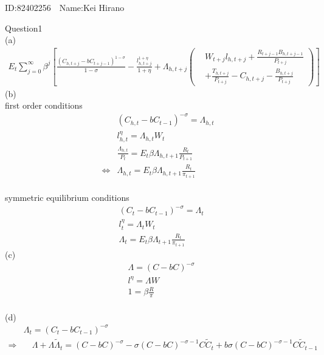\documentclass{article}
\begin{document}
\begin{CJK}{UTF8}{min}
\begin{flushright} %
ID:82402256　Name:Kei Hirano\\
\end{flushright}
Question1\\(a)\\
\begin{align*}
E_t \sum^\infty_{j=0} \beta^j \left[
    \frac{(C_{h,t+j} - b C_{t+j-1})^{1-\sigma}}{1-\sigma} 
    - \frac{l_{h,t+j}^{1+\eta}}{1+\eta} 
    + \Lambda_{h,t+j} \left(
        \begin{aligned}
        & W_{t+j} l_{h,t+j} 
        + \frac{R_{t+j-1} B_{h,t+j-1}}{P_{t+j}} \\
        & + \frac{T_{h,t+j}}{P_{t+j}} 
        - C_{h,t+j} 
        - \frac{B_{h,t+j}}{P_{t+j}} 
        \end{aligned}
    \right)
\right]
\end{align*}
(b)\\
first order conditions\\
\begin{align*}
&(C_{h,t}-bC_{t-1})^{-\sigma}=\Lambda_{h,t}\\
&l^\eta_{h,t}=\Lambda_{h,t}W_{t}\\
&\frac{\Lambda_{h,t}}{P_t}=E_t\beta\Lambda_{h,t+1}\frac{R_t}{P_{t+1}}\\
\Leftrightarrow &\Lambda_{h,t}=E_t\beta\Lambda_{h,t+1}\frac{R_t}{\pi_{t+1}}
\end{align*}\\
symmetric equilibrium conditions
\begin{align*}
&(C_{t}-bC_{t-1})^{-\sigma}=\Lambda_{t}\\
&l^\eta_{t}=\Lambda_{t}W_{t}\\
&\Lambda_{t}=E_t\beta\Lambda_{t+1}\frac{R_t}{\pi_{t+1}}
\end{align*}
(c)\\
\begin{align*}
&\Lambda=(C-bC)^{-\sigma}\\
&l^\eta=\Lambda W\\
&1=\beta \frac{R}{\pi}
\end{align*}\\
(d)\\
\begin{align*}
    &\Lambda_{t}=(C_{t}-bC_{t-1})^{-\sigma} \\
    \Rightarrow & \quad \Lambda+\Lambda \tilde{\Lambda}_t=(C-bC)^{-\sigma}-\sigma(C-bC)^{-\sigma-1}C\tilde{C}_t+b\sigma(C-bC)^{-\sigma-1}C\tilde{C}_{t-1} \\

\end{align*}
\end{CJK}
\end{document}
